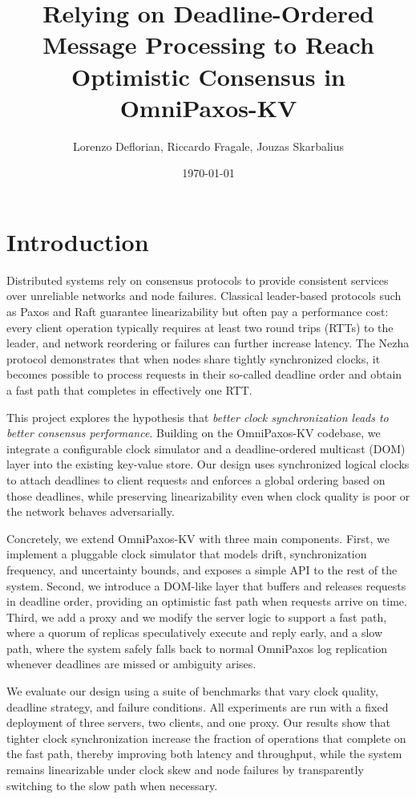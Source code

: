 \documentclass{article}
\title{Relying on Deadline-Ordered Message Processing to Reach Optimistic Consensus in OmniPaxos-KV}
\author{Lorenzo Deflorian, Riccardo Fragale, Jouzas Skarbalius}
\date{\today}
\begin{document}
\maketitle

\tableofcontents
\vspace{1em}

\section{Introduction}
Distributed systems rely on consensus protocols to provide consistent services over unreliable networks and node failures. Classical leader-based protocols such as Paxos and Raft guarantee linearizability but often pay a performance cost: every client operation typically requires at least two round trips (RTTs) to the leader, and network reordering or failures can further increase latency. The Nezha protocol demonstrates that when nodes share tightly synchronized clocks, it becomes possible to process requests in their so-called deadline order and obtain a fast path that completes in effectively one RTT.

This project explores the hypothesis that \emph{better clock synchronization leads to better consensus performance}. Building on the OmniPaxos-KV codebase, we integrate a configurable clock simulator and a deadline-ordered multicast (DOM) layer into the existing key-value store. Our design uses synchronized logical clocks to attach deadlines to client requests and enforces a global ordering based on those deadlines, while preserving linearizability even when clock quality is poor or the network behaves adversarially.

Concretely, we extend OmniPaxos-KV with three main components. First, we implement a pluggable clock simulator that models drift, synchronization frequency, and uncertainty bounds, and exposes a simple API to the rest of the system. Second, we introduce a DOM-like layer that buffers and releases requests in deadline order, providing an optimistic fast path when requests arrive on time. Third, we add a proxy and we modify the server logic to support a fast path, where a quorum of replicas speculatively execute and reply early, and a slow path, where the system safely falls back to normal OmniPaxos log replication whenever deadlines are missed or ambiguity arises.

We evaluate our design using a suite of benchmarks that vary clock quality, deadline strategy, and failure conditions. All experiments are run with a fixed deployment of three servers, two clients, and one proxy. Our results show that tighter clock synchronization increase the fraction of operations that complete on the fast path, thereby improving both latency and throughput, while the system remains linearizable under clock skew and node failures by transparently switching to the slow path when necessary.
\end{document}
